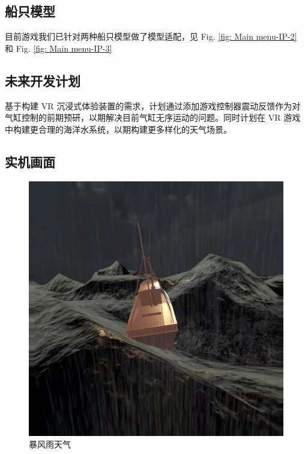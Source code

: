 \documentclass[a4paper,10pt]{article}
\begin{document}
		\subsection{船只模型}
		
		目前游戏我们已针对两种船只模型做了模型适配，见 Fig. \ref{fig: Main menu-IP-2} 和 Fig. \ref{fig: Main menu-IP-3}
		
		\subsection{未来开发计划}
		
		基于构建 VR 沉浸式体验装置的需求，计划通过添加游戏控制器震动反馈作为对气缸控制的前期预研，以期解决目前气缸无序运动的问题。同时计划在 VR 游戏中构建更合理的海洋水系统，以期构建更多样化的天气场景。		
		
		\subsection{实机画面}
		
		\begin{figure}[htb]
			\centering				
			\includegraphics[width=0.9\columnwidth]{picture/Third-person-perspective-Storm}
			\caption{
				\label{fig: Third-person-perspective-Storm} 
				暴风雨天气
			}	
		\end{figure}
		
\end{document}
